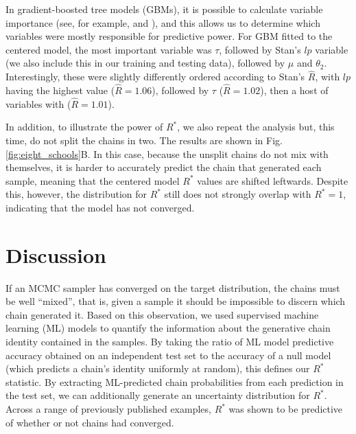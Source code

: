 \documentclass{article}
\begin{document}
In gradient-boosted tree models (GBMs), it is possible to calculate variable importance (see, for example, \cite{friedman2001greedy} and \cite{greenwell2019package}), and this allows us to determine which variables were mostly responsible for predictive power. For GBM fitted to the centered model, the most important variable was $\tau$, followed by Stan's $lp$ variable (we also include this in our training and testing data), followed by $\mu$ and $\theta_2$. Interestingly, these were slightly differently ordered according to Stan's $\hat{R}$, with $lp$ having the highest value ($\hat R = 1.06$), followed by $\tau$ ($\hat R = 1.02$), then a host of variables with ($\hat R = 1.01$).

In addition, to illustrate the power of $R^*$, we also repeat the analysis but, this time, do not split the chains in two. The results are shown in Fig.\ref{fig:eight_schools}B. In this case, because the unsplit chains do not mix with themselves, it is harder to accurately predict the chain that generated each sample, meaning that the centered model $R^*$ values are shifted leftwards. Despite this, however, the distribution for $R^*$ still does not strongly overlap with $R^*=1$, indicating that the model has not converged.


\section{Discussion}
If an MCMC sampler has converged on the target distribution, the chains must be well ``mixed'', that is, given a sample it should be impossible to discern which chain generated it. Based on this observation, we used supervised machine learning (ML) models to quantify the information about the generative chain identity contained in the samples. By taking the ratio of ML model predictive accuracy obtained on an independent test set to the accuracy of a null model (which predicts a chain's identity uniformly at random), this defines our $R^*$ statistic. By extracting ML-predicted chain probabilities from each prediction in the test set, we can additionally generate an uncertainty distribution for $R^*$. Across a range of previously published examples, $R^*$ was shown to be predictive of whether or not chains had converged.
\end{document}
